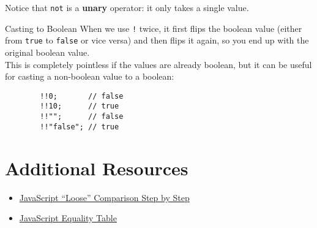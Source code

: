 Notice that \texttt{not} is a \textbf{unary} operator: it only takes a single value.

\pagebreak

\begin{infobox}{Casting to Boolean}
    When we use \texttt{!} twice, it first flips the boolean value (either from \texttt{true} to \texttt{false} or vice versa) and then flips it again, so you end up with the original boolean value.
    \\

    This is completely pointless if the values are already boolean, but it can be useful for casting a non-boolean value to a boolean:

    \begin{verbatim}
        !!0;       // false
        !!10;      // true
        !!"";      // false
        !!"false"; // true
    \end{verbatim}

\end{infobox}


\section{Additional Resources}

\begin{itemize}[leftmargin=*]
    \item \href{https://felix-kling.de/js-loose-comparison/}{JavaScript ``Loose'' Comparison Step by Step}
    \item \href{https://dorey.github.io/JavaScript-Equality-Table/}{JavaScript Equality Table}
\end{itemize}
